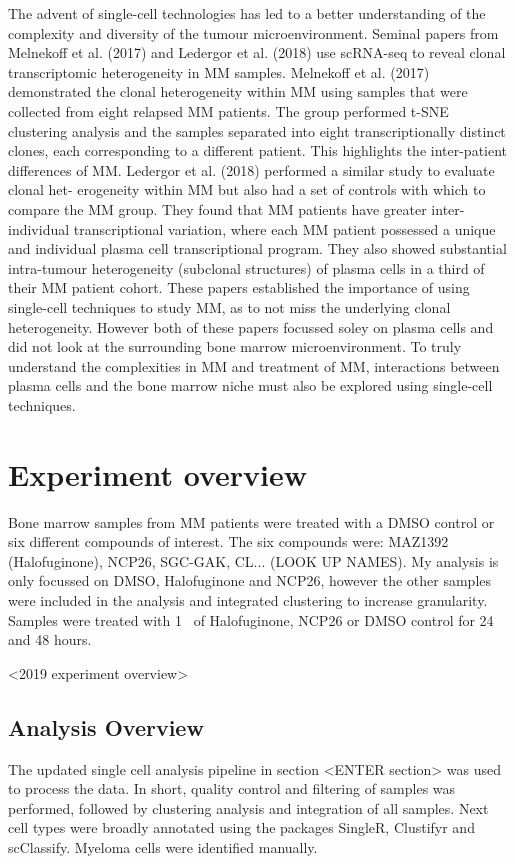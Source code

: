 The advent of single-cell technologies has led to a better understanding of the complexity and diversity of the tumour microenvironment.
Seminal papers from Melnekoff et al. (2017)\cite{melnekoff2017single} and Ledergor et al. (2018)\cite{ledergor2018single} use scRNA-seq to reveal clonal transcriptomic heterogeneity in MM samples.
Melnekoff et al. (2017) demonstrated the clonal heterogeneity within MM using samples that were collected from eight relapsed MM patients.
The group performed t-SNE clustering analysis and the samples separated into eight transcriptionally distinct clones, each corresponding to a different patient.
This highlights the inter-patient differences of MM\@.
Ledergor et al. (2018) performed a similar study to evaluate clonal het- erogeneity within MM but also had a set of controls with which to compare the MM group.
They found that MM patients have greater inter-individual transcriptional variation, where each MM patient possessed a unique and individual plasma cell transcriptional program.
They also showed substantial intra-tumour heterogeneity (subclonal structures) of plasma cells in a third of their MM patient cohort.
These papers established the importance of using single-cell techniques to study MM, as to not miss the underlying clonal heterogeneity.
However both of these papers focussed soley on plasma cells and did not look at the surrounding bone marrow microenvironment.
To truly understand the complexities in MM and treatment of MM, interactions between plasma cells and the bone marrow niche must also be explored using single-cell techniques.


\section{Experiment overview}
Bone marrow samples from MM patients were treated with a DMSO control or six different compounds of interest.
The six compounds were: MAZ1392 (Halofuginone), NCP26, SGC-GAK, CL... (LOOK UP NAMES).
My analysis is only focussed on DMSO, Halofuginone and NCP26, however the other samples were included in the analysis and integrated clustering to increase  granularity.
Samples were treated with 1\si{\micro\Molar} of Halofuginone, NCP26 or DMSO control for 24 and 48 hours.

<2019 experiment overview>

\subsection{Analysis Overview}
The updated single cell analysis pipeline in section <ENTER section> was used to process the data.
In short, quality control and filtering of samples was performed, followed by clustering analysis and integration of all samples.
Next cell types were broadly annotated using the packages SingleR, Clustifyr and scClassify.
Myeloma cells were identified manually.

